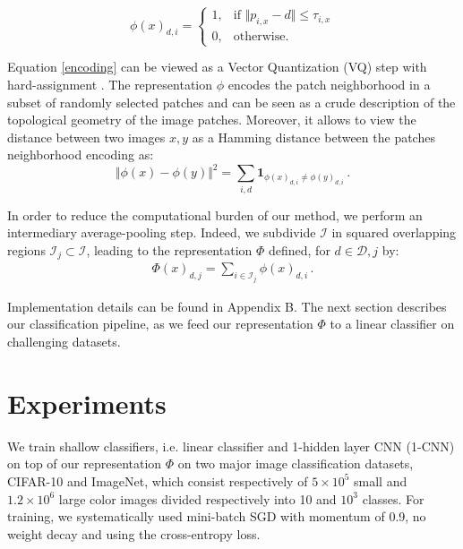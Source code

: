 \documentclass{article} %
\begin{document}
\begin{equation}
\label{encoding}
\phi(x)_{d,i}=
\begin{cases}
1,&\text{if } \Vert  p_{i,x} - d\Vert \leq \tau_{i,x}\\
0,&\text{otherwise}.
\end{cases} 
\end{equation}

Equation \ref{encoding} can be viewed as a Vector Quantization (VQ) step with hard-assignment \citep{coates2011importance}.
The representation $\phi$ encodes the patch neighborhood in a subset of randomly selected patches and can be seen as a crude description of the topological geometry of the image patches.
Moreover, it allows to view the distance between two images $x,y$ as a Hamming distance between the patches neighborhood encoding as:
\[\Vert \phi(x)-\phi(y)\Vert^2 = \sum_{i,d}\mathbf{1}_{\phi(x)_{d,i} \neq \phi(y)_{d,i}}\,.\]


In order to reduce the computational burden of our method, we perform an intermediary average-pooling step.
Indeed, we subdivide $\mathcal{I}$ in squared overlapping regions $\mathcal{I}_j\subset\mathcal{I}$, leading to the representation $\Phi$ defined, for $d\in\mathcal{D}, j$ by:
\begin{align}\Phi(x)_{d,j}= \sum_{i\in \mathcal{I}_j}\phi(x)_{d,i}\,.\end{align}

Implementation details can be found in Appendix B. The next section describes our classification pipeline, as we feed our representation $\Phi$ to a linear classifier on challenging datasets.



\section{Experiments}
\label{experiments}
We train  shallow classifiers, i.e. linear classifier and 1-hidden layer CNN (1-CNN) on top of our representation $\Phi$ on two major  image classification datasets,  CIFAR-10 and ImageNet, which consist respectively of $5\times10^5$ small and $1.2\times10^6$ large color images  divided respectively into 10 and $10^3$ classes.
For training, we systematically used mini-batch SGD with momentum of 0.9, no weight decay and using the cross-entropy loss.
\end{document}
